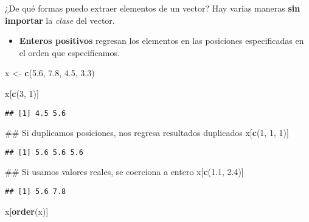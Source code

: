 \documentclass[]{article}
\newenvironment{Shaded}{\begin{snugshade}}{\end{snugshade}}
\newcommand{\KeywordTok}[1]{\textcolor[rgb]{0.13,0.29,0.53}{\textbf{{#1}}}}
\newcommand{\DecValTok}[1]{\textcolor[rgb]{0.00,0.00,0.81}{{#1}}}
\newcommand{\FloatTok}[1]{\textcolor[rgb]{0.00,0.00,0.81}{{#1}}}
\newcommand{\StringTok}[1]{\textcolor[rgb]{0.31,0.60,0.02}{{#1}}}
\newcommand{\NormalTok}[1]{{#1}}
\begin{document}
¿De qué formas puedo extraer elementos de un vector? Hay varias maneras
\textbf{sin importar} la \emph{clase} del vector.

\begin{itemize}
\itemsep1pt\parskip0pt
\item
  \textbf{Enteros positivos} regresan los elementos en las posiciones
  especificadas en el orden que especificamos.
\end{itemize}

\begin{Shaded}
\begin{Highlighting}[]
\NormalTok{x <-}\StringTok{ }\KeywordTok{c}\NormalTok{(}\FloatTok{5.6}\NormalTok{, }\FloatTok{7.8}\NormalTok{, }\FloatTok{4.5}\NormalTok{, }\FloatTok{3.3}\NormalTok{)}

\NormalTok{x[}\KeywordTok{c}\NormalTok{(}\DecValTok{3}\NormalTok{, }\DecValTok{1}\NormalTok{)]}
\end{Highlighting}
\end{Shaded}

\begin{verbatim}
## [1] 4.5 5.6
\end{verbatim}

\begin{Shaded}
\begin{Highlighting}[]
\NormalTok{## Si duplicamos posiciones, nos regresa resultados duplicados}
\NormalTok{x[}\KeywordTok{c}\NormalTok{(}\DecValTok{1}\NormalTok{, }\DecValTok{1}\NormalTok{, }\DecValTok{1}\NormalTok{)]}
\end{Highlighting}
\end{Shaded}

\begin{verbatim}
## [1] 5.6 5.6 5.6
\end{verbatim}

\begin{Shaded}
\begin{Highlighting}[]
\NormalTok{## Si usamos valores reales, se coerciona a entero}
\NormalTok{x[}\KeywordTok{c}\NormalTok{(}\FloatTok{1.1}\NormalTok{, }\FloatTok{2.4}\NormalTok{)]}
\end{Highlighting}
\end{Shaded}

\begin{verbatim}
## [1] 5.6 7.8
\end{verbatim}

\begin{Shaded}
\begin{Highlighting}[]
\NormalTok{x[}\KeywordTok{order}\NormalTok{(x)]}
\end{Highlighting}
\end{Shaded}
\end{document}
